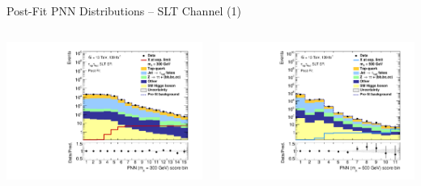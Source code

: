 \documentclass[11pt, xcolor={dvipsnames}, aspectratio=169, notes]{beamer}
\begin{document}

\begin{frame}{Post-Fit PNN Distributions -- \allbold{\lephad} SLT Channel (1)}
  \begin{columns}
    \centering


    \includegraphics[width=\textwidth]{results_res/postfit/Region_BMin0_incJet1_dist300_J2_D2HDMPNN_T2_SpcTauLH_Y2015_LTT0_L1_GlobalFit_conditionnal_mu0log}

    \centering


    \includegraphics[width=\textwidth]{results_res/postfit/Region_BMin0_incJet1_dist500_J2_D2HDMPNN_T2_SpcTauLH_Y2015_LTT0_L1_GlobalFit_conditionnal_mu0log}


\end{columns}
\end{frame}
\end{document}
